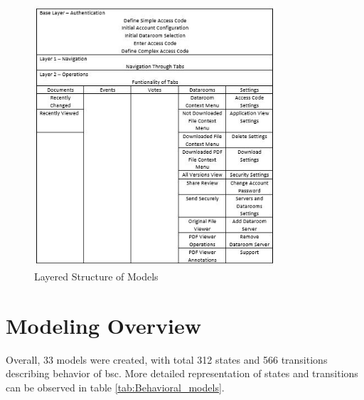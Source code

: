 \begin{figure} [htbp!]
	\centering
					\includegraphics[width=0.8\textwidth]{figures/Layers}
					\caption{\label{Fig:Layers} Layered Structure of Models}
\end{figure}

\section{Modeling Overview}
\par
Overall, 33 models were created, with total 312 states and 566 transitions describing behavior of \acrshort{bsc}. More detailed representation of states and transitions can be observed in table \ref{tab:Behavioral_models}.


